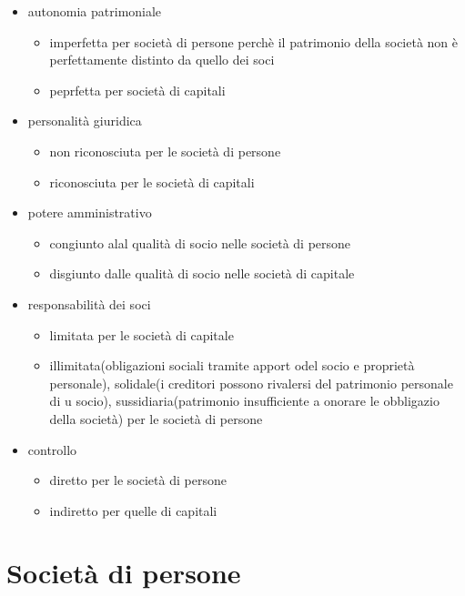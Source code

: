 \begin{itemize}
    \item autonomia patrimoniale
    \begin{itemize}
        \item imperfetta per società di persone perchè il patrimonio della società non è perfettamente
        distinto da quello dei soci
        \item peprfetta per società di capitali
    \end{itemize}
    \item personalità giuridica
    \begin{itemize}
        \item non riconosciuta per le società di persone
        \item riconosciuta per le società di capitali
    \end{itemize}
    \item potere amministrativo
    \begin{itemize}
        \item congiunto alal qualità di socio nelle società di persone
        \item disgiunto dalle qualità di socio nelle società di capitale
    \end{itemize}
    \item responsabilità dei soci
    \begin{itemize}
        \item limitata per le società di capitale
        \item illimitata(obligazioni sociali tramite apport odel socio e proprietà personale),
         solidale(i creditori possono rivalersi del patrimonio personale di u socio),
         sussidiaria(patrimonio insufficiente a onorare le obbligazio della società) per le società di persone
    \end{itemize}
    \item controllo
    \begin{itemize}
        \item diretto per le società di persone
        \item indiretto per quelle di capitali
    \end{itemize}
\end{itemize}

\section{Società di persone}
